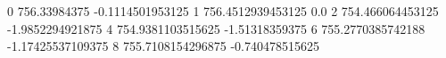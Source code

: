 0 756.33984375 -0.1114501953125
1 756.4512939453125 0.0
2 754.466064453125 -1.9852294921875
4 754.9381103515625 -1.51318359375
6 755.2770385742188 -1.17425537109375
8 755.7108154296875 -0.740478515625
